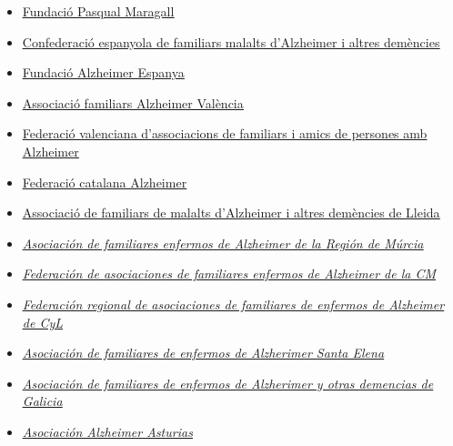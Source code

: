 \documentclass[a4paper,12pt]{article}
\begin{document}
\begin{itemize}
    \item \href{https://fpmaragall.org/ca/}{\underline{Fundació Pasqual Maragall}}
    \item \href{https://www.ceafa.es/es}{\underline{Confederació espanyola de familiars malalts d'Alzheimer i altres demències}}
    \item \href{http://www.alzfae.org/}{\underline{Fundació Alzheimer Espanya}}
    \item \href{https://www.afav.org/}{\underline{Associació familiars Alzheimer València}}
    \item \href{https://www.fevafa.org/quienes-somos/}{\underline{Federació valenciana d'associacions de familiars i amics de persones amb Alzheimer}}
    \item \href{https://www.fafac.cat/}{\underline{Federació catalana Alzheimer}}
    \item \href{http://www.lleidaparticipa.cat/index_web.php?idwc=czoxNToiYWx6aGVpbWVybGxlaWRhIjs=}{\underline{Associació de familiars de malalts d'Alzheimer i altres demències de Lleida}}
    \item \href{https://afamur.es/que-es-afamur/}{\underline{\textit{Asociación de familiares enfermos de Alzheimer de la Región de Múrcia}}}
    \item \href{https://fafal.org/}{\underline{\textit{Federación de asociaciones de familiares enfermos de Alzheimer de la CM}}}
    \item \href{https://www.afacayle.es/}{\underline{\textit{Federación regional de asociaciones de familiares de enfermos de Alzheimer de CyL}}}
    \item \href{https://www.alzheimersevilla.com/}{\underline{\textit{Asociación de familiares de enfermos de Alzherimer Santa Elena}}}
    \item \href{https://afaga.com/es/asociacion/historia/}{\underline{\textit{Asociación de familiares de enfermos de Alzherimer y otras demencias de Galicia}}}
    \item \href{https://www.asociacionalzheimer.com/}{\underline{\textit{Asociación Alzheimer Asturias}}}
\end{itemize}
\end{document}
